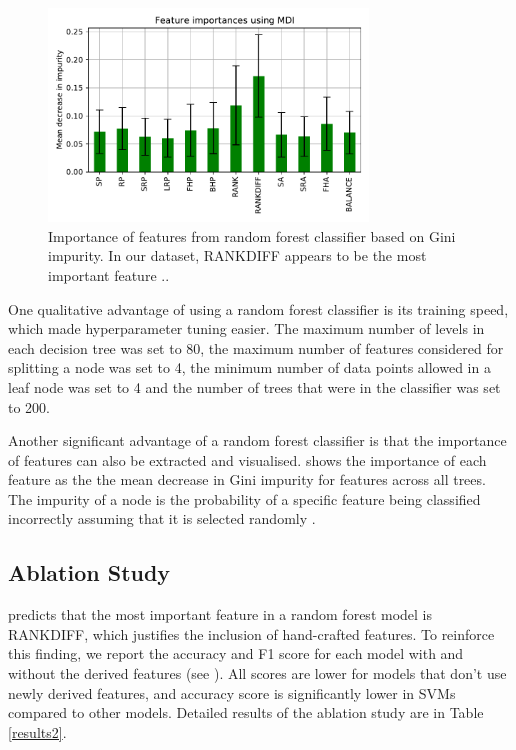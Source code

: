

\begin{figure}[ht]

\includegraphics[width=8.5cm]{plots/feature_importance.pdf}
\caption{Importance of features from random forest classifier based on Gini impurity. In our dataset, RANKDIFF appears to be the most important feature .. }

\label{fig:fig4}
\centering
\end{figure}

One qualitative advantage of using a random forest classifier is its training speed, which made hyperparameter tuning easier. The maximum number of levels in each decision tree was set to 80, the maximum number of features considered for splitting a node was set to 4, the minimum number of data points allowed in a leaf node was set to 4 and the number of trees that were in the classifier was set to 200.

Another significant advantage of a random forest classifier is that the importance of features can also be extracted and visualised.   shows the importance of each feature as the the mean decrease in Gini impurity for features across all trees. The impurity of a node is the probability of a specific feature being classified incorrectly assuming that it is selected randomly \cite{cassidy2014calculating}.


\subsection{Ablation Study}
 predicts that the most important feature in a random forest model is  RANKDIFF, which justifies the inclusion of hand-crafted features. To reinforce this finding, we report the accuracy and F1 score for each model with and without the derived features (see ). All scores are lower for models that don't use newly derived features, and accuracy score is significantly lower in SVMs compared to other models. Detailed results of the ablation study are  in Table \ref{results2}.

